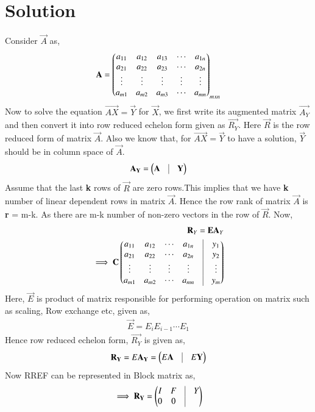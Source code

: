 \documentclass[journal,12pt,twocolumn]{IEEEtran}
\begin{document}
\section{Solution}
Consider $\vec{A}$ as,
\begin{align}
\mathbf{A} = \begin{pmatrix}a_{11}&a_{12}&a_{13}&\cdots&a_{1n}\\a_{21}&a_{22}&a_{23}&\cdots&a_{2n}\\\vdots&\vdots&\vdots&\vdots&\vdots\\a_{m1}&a_{m2}&a_{m3}&\cdots&a_{mn}\end{pmatrix}_{mxn}
\end{align} 
Now to solve the equation $\vec{AX}=\vec{Y}$ for $\vec{X}$, we first write its augmented matrix $\vec{A_Y}$ and then convert it into row reduced echelon form given as $\vec{R_Y}$. Here $\vec{R}$ is the row reduced form of matrix $\vec{A}$. Also we know that, for $\vec{AX}=\vec{Y}$ to have a solution, $\vec{Y}$ should be in column space of $\vec{A}$.
\begin{align}
\vec{A_Y}=\myvec{\vec{A}&\vrule&\vec{Y}}
\end{align} 
Assume that the last \textbf{k} rows of $\vec{R}$ are zero rows.This implies that we have \textbf{k} number of linear dependent rows in matrix $\vec{A}$. Hence the row rank of matrix $\vec{A}$ is \textbf{r} = m-k. As there are m-k number of non-zero vectors in the row of $\vec{R}$. Now, 
\begin{align}
\vec{R}_{Y} = \vec{EA}_{Y} \\ \implies \vec{C} \myvec{a_{11}&a_{12}&\cdots&a_{1n}&\vrule&y_{1} \\a_{21}&a_{22}&\cdots&a_{2n}&\vrule&y_{2}\\\vdots&\vdots&\vdots&\vdots&\vrule&\vdots\\a_{m1}&a_{m2}&\cdots&a_{mn}&\vrule&y_{m}}
\end{align}
Here, $\vec{E}$ is product of matrix responsible for performing operation on matrix such as scaling, Row exchange etc, given as, 
\begin{align}
\vec{E} = E_iE_{i-1} \cdots E_1
\end{align}
Hence row reduced echelon form, $\vec{R_Y}$ is given as,
\begin{align}
\vec{R_Y} = E\vec{A_Y} = \myvec{E\vec{A}&\vrule&E\vec{Y}}
\end{align}
Now RREF can be represented in Block matrix as,
\begin{align}
\implies \vec{R_Y} = \myvec{I&F&\vrule&Y\\0&0&\vrule} \label{rref}
\end{align}
\end{document}
